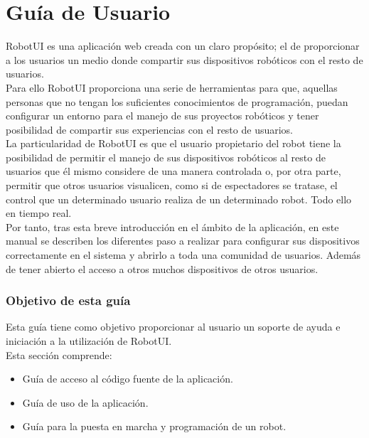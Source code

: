 \chapter{ Guía de Usuario}
\label{chap:manual-usuario}

RobotUI es una aplicación web creada con un claro propósito; el de  proporcionar a los usuarios un medio donde compartir sus dispositivos robóticos con el resto de usuarios.\\

Para ello RobotUI proporciona una serie de herramientas para que, aquellas personas que no tengan los suficientes conocimientos de programación, puedan configurar un
entorno para el manejo de sus proyectos robóticos y tener posibilidad de compartir sus experiencias con el resto de usuarios.\\

La particularidad de RobotUI es que el usuario propietario del robot tiene la posibilidad de permitir el manejo de sus dispositivos robóticos al resto de usuarios que él mismo considere de una 
manera controlada o, por otra parte, permitir que otros usuarios visualicen, como si de espectadores se tratase, el control que un determinado usuario realiza de un determinado robot.
Todo ello en tiempo real.\\

Por tanto, tras esta breve introducción en el ámbito de la aplicación, en este manual se describen los diferentes paso a realizar para configurar sus dispositivos correctamente en el sistema
y abrirlo a toda una comunidad de usuarios. Además de tener abierto el acceso a otros muchos dispositivos de otros usuarios.\\

\subsection{Objetivo de esta guía}

Esta guía tiene como objetivo proporcionar al usuario un soporte de ayuda e
iniciación a la utilización de RobotUI.\\

Esta sección comprende:\\

\begin{itemize}
 \item Guía de acceso al código fuente de la aplicación.
 \item Guía de uso de la aplicación.
 \item Guía para la puesta en marcha y programación de un robot.
\end{itemize}

